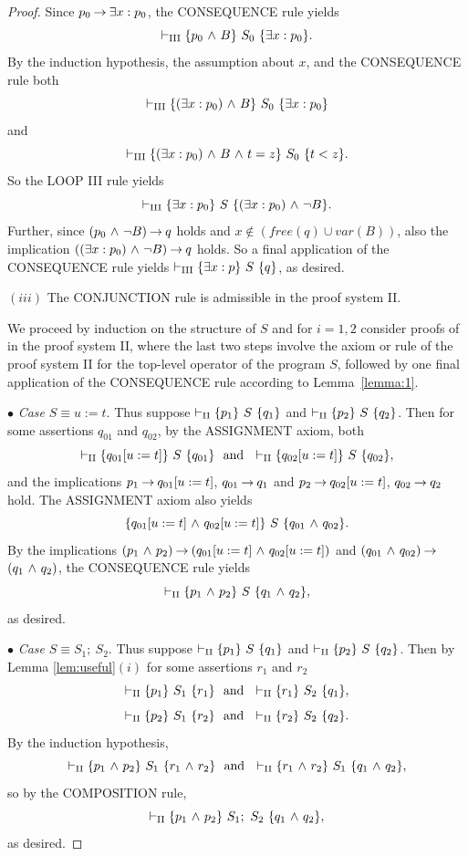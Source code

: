 \documentclass[runningheads]{llncs}       %
\begin{document}
\begin{proof}
Since $p_0 \mbox{$\:\rightarrow\:$} \mbox{$\exists$} x: p_0$, the CONSEQUENCE rule yields
\[
 \vdash_{\rm{III}} \mbox{$\{{p_{0} \mbox{$\ \wedge\ $} B}\}\ {S_0}\ \{{\mbox{$\exists$} x: p_{0}}\}$}.
\]
By the induction hypothesis, the assumption about $x$,
and the CONSEQUENCE rule both
\[
 \vdash_{\rm{III}} \mbox{$\{{(\mbox{$\exists$} x:p_0) \mbox{$\ \wedge\ $} B}\}\ {S_0}\ \{{\mbox{$\exists$} x: p_{0}}\}$}
\]
and
\[
 \vdash_{\rm{III}} \mbox{$\{{(\mbox{$\exists$} x:p_0) \mbox{$\ \wedge\ $} B \mbox{$\ \wedge\ $} t = z}\}\ {S_0}\ \{{t < z}\}$}.
\]
So the LOOP III rule yields 
\[
 \vdash_{\rm{III}} \mbox{$\{{\mbox{$\exists$} x:p_0}\}\ {S}\ \{{(\mbox{$\exists$} x:p_0) \mbox{$\ \wedge\ $} \neg B}\}$}.
\]
Further, since $(p_{0} \mbox{$\ \wedge\ $} \neg B) \mbox{$\:\rightarrow\:$} q$ holds and
$x \not\in (\mathit{free(q)} \cup var(B))$, also the implication
$((\mbox{$\exists$} x:p_0) \mbox{$\ \wedge\ $} \neg B) \mbox{$\:\rightarrow\:$} q$ holds.  So a final application of the
CONSEQUENCE rule yields $\vdash_{\rm{III}} \mbox{$\{{\mbox{$\exists$} x:p}\}\ {S}\ \{{q}\}$}$, as
desired.


\vspace{3mm}

\NI
$(iii)$ The {\rm CONJUNCTION} rule is admissible in the proof system {\rm II}.

We proceed by induction on the structure of $S$
and for $i=1,2$ consider proofs of  in the proof system \rm{II}, where 
the last two steps involve the axiom or rule of the proof system \rm{II} 
for the top-level operator of the program $S$, 
followed by one final application of the CONSEQUENCE rule
according to Lemma~\ref{lemma:1}.


\vspace{2mm}

\NI
$\bullet$ \emph{Case} $S \equiv u:=t$.
Thus suppose $\vdash_{\rm{II}} \mbox{$\{{p_1}\}\ {S}\ \{{q_1}\}$}$ and
$\vdash_{\rm{II}} \mbox{$\{{p_2}\}\ {S}\ \{{q_2}\}$}$.
Then for some assertions $q_{01}$ and $q_{02}$,
by the ASSIGNMENT axiom, both
\[
 \vdash_{\rm{II}} \HT{q_{01}[u:=t]}{S}{q_{01}} \ \mbox{ and }\
 \vdash_{\rm{II}} \HT{q_{02}[u:=t]}{S}{q_{02}},
\]
and the implications 
$p_1 \mbox{$\:\rightarrow\:$} q_{01}[u:=t]$, $q_{01} \mbox{$\:\rightarrow\:$} q_1$ and
$p_2 \mbox{$\:\rightarrow\:$} q_{02}[u:=t]$, $q_{02} \mbox{$\:\rightarrow\:$} q_2$ hold.
The ASSIGNMENT axiom also yields
\[
 \mbox{$\{{q_{01}[u:=t] \mbox{$\ \wedge\ $} q_{02}[u:=t]}\}\ {S}\ \{{q_{01} \mbox{$\ \wedge\ $} q_{02}}\}$}.
\]
By the implications 
$(p_1 \mbox{$\ \wedge\ $} p_2) \mbox{$\:\rightarrow\:$} (q_{01}[u:=t] \mbox{$\ \wedge\ $} q_{02}[u:=t])$ and 
$(q_{01} \mbox{$\ \wedge\ $} q_{02}) \mbox{$\:\rightarrow\:$}$ $(q_1 \mbox{$\ \wedge\ $} q_2)$,
the CONSEQUENCE rule yields
\[
  \vdash_{\rm{II}} \mbox{$\{{p_1 \mbox{$\ \wedge\ $} p_2}\}\ {S}\ \{{q_1 \mbox{$\ \wedge\ $} q_2}\}$},
\]
as desired.

\vspace{2mm}

\NI
$\bullet$ \emph{Case} $S \equiv S_1 ;\ S_2$.
Thus suppose $\vdash_{\rm{II}} \mbox{$\{{p_1}\}\ {S}\ \{{q_1}\}$}$ and
$\vdash_{\rm{II}} \mbox{$\{{p_2}\}\ {S}\ \{{q_2}\}$}$.
Then by Lemma \ref{lem:useful}$(i)$ for some assertions $r_1$ and $r_2$
\[
 \vdash_{\rm{II}} \HT{p_{1}}{S_1}{r_1} \ \mbox{ and }\ 
 \vdash_{\rm{II}} \HT{r_1}{S_2}{q_{1}},
\]
\[
 \vdash_{\rm{II}} \mbox{$\{{p_{2}}\}\ {S_1}\ \{{r_2}\}$} \ \mbox{ and }\
 \vdash_{\rm{II}} \mbox{$\{{r_2}\}\ {S_2}\ \{{q_{2}}\}$}.
\]
By the induction hypothesis,
\[
 \vdash_{\rm{II}} \mbox{$\{{p_1 \mbox{$\ \wedge\ $} p_2}\}\ {S_1}\ \{{r_1 \mbox{$\ \wedge\ $} r_2}\}$} \ \mbox{ and }\
 \vdash_{\rm{II}} \mbox{$\{{r_1 \mbox{$\ \wedge\ $} r_2}\}\ {S_1}\ \{{q_1 \mbox{$\ \wedge\ $} q_2}\}$},
\]
so by the COMPOSITION rule,
\[
  \vdash_{\rm{II}} \mbox{$\{{p_1 \mbox{$\ \wedge\ $} p_2}\}\ {S_1;\ S_2}\ \{{q_1 \mbox{$\ \wedge\ $} q_2}\}$},
\]
as desired.


\end{proof}
\end{document}
